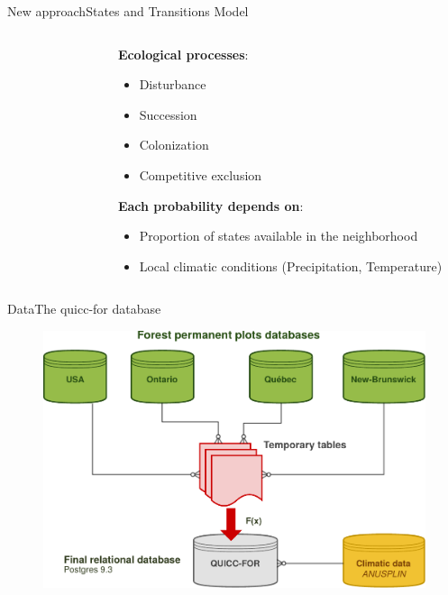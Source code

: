 \documentclass[10pt,aspectratio=149]{beamer}
\begin{document}
\begin{frame}{New approach}{States and Transitions Model}


\begin{columns}[t]
	\begin{column}[t]{.40\paperwidth}
		\begin{figure}
			\small{}
		\end{figure}
	\end{column}
	\begin{column}[t]{.50\paperwidth}
	\textbf{Ecological processes}:
	\begin{itemize}
		\item Disturbance
		\item Succession
		\item Colonization
		\item Competitive exclusion
	\end{itemize}
	\vspace{1em}
	\textbf{Each probability depends on}:
		\begin{itemize}
			\item Proportion of states available in the neighborhood
			\item Local climatic conditions (Precipitation, Temperature)
		\end{itemize}
	\end{column}
\end{columns}

\end{frame}



\begin{frame}{Data}{The quicc-for database}
	\vspace{-1em}
\begin{figure}
	\includegraphics[width=.70\paperwidth]{Figs/QUICCFOR.pdf}
\end{figure}

\end{frame}
\end{document}
